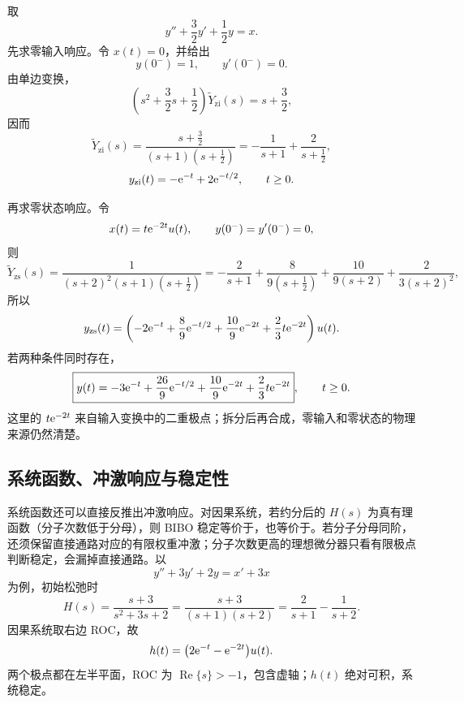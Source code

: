 \begin{example}
\label{eg:laplace-zero-input-zero-state}
  取
  \[
    y''+\frac32y'+\frac12y=x.
  \]
  先求零输入响应。令 $x(t)=0$，并给出
  \[
    y(0^-)=1,\qquad y'(0^-)=0.
  \]
  由单边变换，
  \[
    \left(s^2+\frac32s+\frac12\right)\widetilde Y_{\mathrm{zi}}(s)
    =s+\frac32,
  \]
  因而
  \[
    \widetilde Y_{\mathrm{zi}}(s)
    =\frac{s+\frac32}{(s+1)(s+\frac12)}
    =-\frac{1}{s+1}+\frac{2}{s+\frac12},
  \]
  \[
    y_{\mathrm{zi}}(t)
    =-\mathrm{e}^{-t}+2\mathrm{e}^{-t/2},\qquad t\geq0.
  \]

  再求零状态响应。令
  \[
    x(t)=t\mathrm{e}^{-2t}u(t),\qquad
    y(0^-)=y'(0^-)=0,
  \]
  则
  \[
    \widetilde Y_{\mathrm{zs}}(s)
    =\frac{1}{(s+2)^2(s+1)(s+\frac12)}
    =-\frac{2}{s+1}+\frac{8}{9(s+\frac12)}
      +\frac{10}{9(s+2)}+\frac{2}{3(s+2)^2},
  \]
  所以
  \[
    y_{\mathrm{zs}}(t)
    =\left(-2\mathrm{e}^{-t}+\frac89\mathrm{e}^{-t/2}
      +\frac{10}{9}\mathrm{e}^{-2t}+\frac23t\mathrm{e}^{-2t}\right)u(t).
  \]
  若两种条件同时存在，
  \[
    \boxed{
    y(t)=
    -3\mathrm{e}^{-t}+\frac{26}{9}\mathrm{e}^{-t/2}
      +\frac{10}{9}\mathrm{e}^{-2t}+\frac23t\mathrm{e}^{-2t}},\qquad t\geq0.
  \]
  这里的 $t\mathrm{e}^{-2t}$ 来自输入变换中的二重极点；拆分后再合成，零输入和零状态的物理来源仍然清楚。
\end{example}

\subsection{系统函数、冲激响应与稳定性}
\label{subsec:laplace-system-function-response}

系统函数还可以直接反推出冲激响应。对因果系统，若约分后的 $H(s)$ 为真有理函数（分子次数低于分母），则 BIBO 稳定等价于，也等价于。若分子分母同阶，还须保留直接通路对应的有限权重冲激；分子次数更高的理想微分器只看有限极点判断稳定，会漏掉直接通路。以
\[
  y''+3y'+2y=x'+3x
\]
为例，初始松弛时
\[
  H(s)=\frac{s+3}{s^2+3s+2}
  =\frac{s+3}{(s+1)(s+2)}
  =\frac{2}{s+1}-\frac{1}{s+2}.
\]
因果系统取右边 ROC，故
\begin{equation}
  h(t)=\bigl(2\mathrm{e}^{-t}-\mathrm{e}^{-2t}\bigr)u(t).
  \label{eq:laplace-ode-impulse-response}
\end{equation}
两个极点都在左半平面，ROC 为 $\operatorname{Re}\{s\}>-1$，包含虚轴；$h(t)$ 绝对可积，系统稳定。

